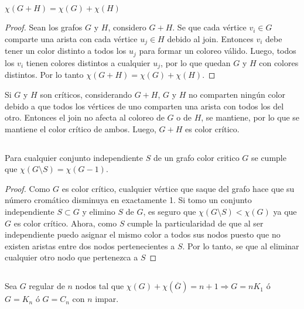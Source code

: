 \subsection{}
\begin{prop}
	$\chi(G + H) = \chi(G) + \chi(H)$
\end{prop}

\begin{proof}
	Sean los grafos $G$ y $H$, considero $G + H$. Se que cada vértice $v_i \in G$ comparte una arista con cada vértice $u_j \in H$ debido al join. Entonces $v_i$ debe tener un color distinto a todos los $u_j$ para formar un coloreo válido. Luego, todos los $v_i$ tienen colores distintos a cualquier $u_j$, por lo que quedan $G$ y $H$ con colores distintos. Por lo tanto $\chi(G + H) = \chi(G) + \chi(H)$.
\end{proof}

\begin{cor}
	Si $G$ y $H$ son críticos, considerando $G + H$, $G$ y $H$ no comparten ningún color debido a que todos los vértices de uno comparten una arista con todos los del otro. Entonces el join no afecta al coloreo de $G$ o de $H$, se mantiene, por lo que se mantiene el color crítico de ambos. Luego, $G + H$ es color crítico.
\end{cor}

\subsection{}
\begin{lema}
	Para cualquier conjunto independiente $S$ de un grafo color critico $G$ se cumple que $\chi(G \setminus S) = \chi(G - 1)$.
\end{lema}

\begin{proof}
	Como $G$ es color crítico, cualquier vértice que saque del grafo hace que su número cromático disminuya en exactamente 1. Si tomo un conjunto independiente $S \subset G$ y elimino $S$ de $G$, es seguro que $\chi(G \setminus S) < \chi(G)$ ya que $G$ es color crítico. Ahora, como $S$ cumple la particularidad de que al ser independiente puedo asignar el mismo color a todos sus nodos puesto que no existen aristas entre dos nodos pertenecientes a $S$. Por lo tanto, se que al eliminar cualquier otro nodo que pertenezca a $S$ 
\end{proof}

\subsection{}
\begin{lema}
	Sea $G$ regular de $n$ nodos tal que $\chi(G) + \chi(\overline{G}) = n + 1 \Longrightarrow G = n K_1$ ó $G = K_n$ ó $G = C_n$ con $n$ impar.
\end{lema}

